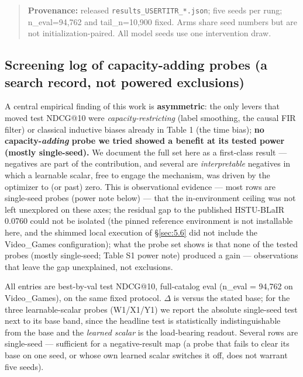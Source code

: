 \begin{quote}
\textbf{Provenance:} released \texttt{results\_USERTITR\_*.json}; five seeds per
rung; n\_eval=94,762 and tail\_n=10,900 fixed. Arms share seed numbers but are not
initialization-paired. All model seeds use one intervention draw.
\end{quote}


\subsection{Screening log of capacity-adding probes (a search record, not powered exclusions)}\label{sec:5.5}


A central empirical finding of this work is \textbf{asymmetric}: the only levers that moved test NDCG@10 were \emph{capacity-restricting} (label smoothing, the causal FIR filter) or classical inductive biases already in Table 1 (the time bias); \textbf{no capacity-\emph{adding} probe we tried showed a benefit at its tested power (mostly single-seed).} We document the full set here as a first-class result --- negatives are part of the contribution, and several are \emph{interpretable} negatives in which a learnable scalar, free to engage the mechanism, was driven by the optimizer to (or past) zero. This is observational evidence --- most rows are single-seed probes (power note below) --- that the in-environment ceiling was not left unexplored on these axes; the residual gap to the published HSTU-BLaIR 0.0760 could not be isolated (the pinned reference environment is not installable here, and the shimmed local execution of \S\ref{sec:5.6} did not include the Video\_Games configuration); what the probe set shows is that none of the tested probes (mostly single-seed; Table S1 power note) produced a gain --- observations that leave the gap unexplained, not exclusions.


All entries are best-by-val test NDCG@10, full-catalog eval (n\_eval = 94,762 on Video\_Games), on the same fixed protocol. \ensuremath{\Delta} is versus the stated base; for the three learnable-scalar probes (W1/X1/Y1) we report the absolute single-seed test next to its base band, since the headline test is statistically indistinguishable from the base and the \emph{learned scalar} is the load-bearing readout. Several rows are single-seed --- sufficient for a negative-result map (a probe that fails to clear its base on one seed, or whose own learned scalar switches it off, does not warrant five seeds).


